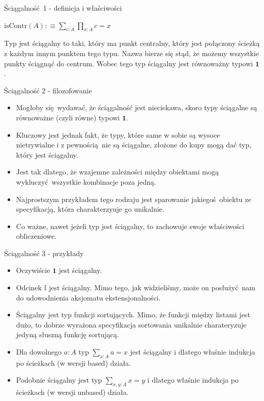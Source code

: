 \documentclass{beamer}
\newcommand{\defn}{:\equiv}
\newcommand{\isContr}{\text{isContr}}
\newcommand{\I}{\mathbb{I}}
\begin{document}
\begin{frame}{Ściągalność 1 - definicja i właściwości}

\begin{definition}[Ściągalność]
$
\displaystyle
\isContr(A) \defn \sum_{c : A} \prod_{x : A} c = x
$
\end{definition}

Typ jest ściągalny to taki, który ma punkt centralny, który jest połączony ścieżką z każdym innym punktem tego typu. Nazwa bierze się stąd, że możemy wszystkie punkty ściągnąć do centrum. Wobec tego typ ściągalny jest równoważny typowi $\mathbf{1}$.

\end{frame}

\begin{frame}{Ściągalność 2 - filozofowanie}
\begin{itemize}
	\item Mogłoby się wydawać, że ściągalność jest nieciekawa, skoro typy ściągalne są równoważne (czyli równe) typowi $\mathbf{1}$.
	\item Kluczowy jest jednak fakt, że typy, które same w sobie są wysoce nietrywialne i z pewnością nie są ściągalne, złożone do kupy mogą dać typ, który jest ściągalny.
	\item Jest tak dlatego, że wzajemne zależności między obiektami mogą wykluczyć wszystkie kombinacje poza jedną.
	\item Najprostszym przykładem tego rodzaju jest sparowanie jakiegoś obiektu ze specyfikacją, która charakterzyuje go unikalnie.
	\item Co ważne, nawet jeżeli typ jest ściągalny, to zachowuje swoje właściwości obliczeniowe.
\end{itemize}
\end{frame}

\begin{frame}{Ściągalność 3 - przykłady}
\begin{itemize}
	\item Oczywiście $\mathbf{1}$ jest ściągalny.
	\item Odcinek $\I$ jest ściągalny. Mimo tego, jak widzieliśmy, może on posłużyć nam do udowodnienia aksjomatu ekstensjonalności.
	\item Ściągalny jest typ funkcji sortujących. Mimo, że funkcji między listami jest dużo, to dobrze wyrażona specyfikacja sortowania unikalnie charateryzuje jedyną słuszną funkcję sortującą.
	\item Dla dowolnego $a : A$ typ $\sum_{x : A} a = x$ jest ściągalny i dlatego właśnie indukcja po ścieżkach (w wersji based) działa.
	\item Podobnie ściągalny jest typ $\sum_{x,y : A} x = y$ i dlatego właśnie indukcja po ścieżkach (w wersji unbased) działa.
\end{itemize}
\end{frame}
\end{document}
